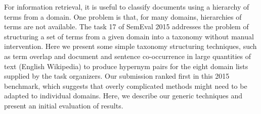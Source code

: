 For information retrieval, it is useful to classify documents using a hierarchy of terms from a domain. One problem is that, for many domains, hierarchies of terms are not available. The task 17 of SemEval 2015 addresses the problem of structuring a set of terms from a given domain into a taxonomy without manual intervention. Here we present some simple taxonomy structuring techniques, such as term overlap and document and sentence co-occurrence in large quantities of text (English Wikipedia) to produce hypernym pairs for the eight domain lists supplied by the task organizers. Our submission ranked first in this 2015 benchmark, which suggests that overly complicated methods might need to be adapted to individual domains. Here, we describe our generic techniques and present an initial evaluation of results.
